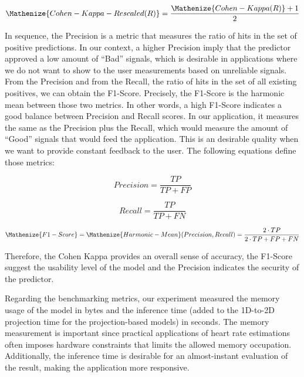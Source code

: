 \begin{equation}
\Mathenize{Cohen-Kappa-Rescaled(R)} = \frac{\Mathenize{Cohen-Kappa(R)}+1}{2} 
\end{equation}  

In sequence, the Precision is a metric that measures the ratio of hits in the set of positive predictions. In our context, a higher Precision imply that the predictor approved a low amount of ``Bad'' signals, which is desirable in applications where we do not want to show to the user measurements based on unreliable signals. From the Precision and from the Recall, the ratio of hits in the set of all existing positives, we can obtain the F1-Score. Precisely, the F1-Score is the harmonic mean between those two metrics. In other words, a high F1-Score indicates a good balance between Precision and Recall scores. In our application, it measures the same as the Precision plus the Recall, which would measure the amount of ``Good'' signals that would feed the application. This is an desirable quality when we want to provide constant feedback to the user. The following equations define those metrics:

\begin{equation} \label{eq:Precision}
Precision = \frac{TP}{TP+FP}
\end{equation}


\begin{equation} \label{eq:Recall}
Recall = \frac{TP}{TP+FN}
\end{equation}

\begin{equation} \label{eq:F1-Score}
\Mathenize{F1-Score}  = \Mathenize{Harmonic-Mean}(Precision,Recall) = \frac{2 \cdot TP}{2 \cdot TP + FP + FN}
\end{equation}

\noindent Therefore, the Cohen Kappa provides an overall sense of accuracy, the F1-Score suggest the usability level of the model and the Precision indicates the security of the predictor. 

Regarding the benchmarking metrics, our experiment measured the memory usage of the model in bytes and the inference time (added to the 1D-to-2D projection time for the projection-based models) in seconds. The memory measurement is important since practical applications of heart rate estimations often imposes hardware constraints that limits the allowed memory occupation. Additionally, the inference time is desirable for an almost-instant evaluation of the result, making the application more responsive.

